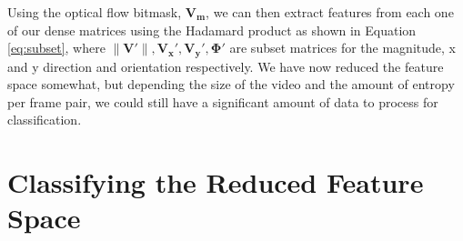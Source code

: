 Using the optical flow bitmask, $\mathbf{V_m}$, we can then extract features
from each one of our dense matrices using the Hadamard product as shown in
Equation \ref{eq:subset}, where $\|\mathbf{V\prime}\|, \mathbf{V_x\prime},\mathbf{V_y\prime},
\mathbf{\Phi\prime}$ are subset matrices for the magnitude, x and y direction
and orientation respectively. We have now reduced the feature space somewhat,
but depending the size of the video and the amount of entropy per frame pair,
we could still have a significant amount of data to process for classification.





\section{\label{section:classification}Classifying the Reduced Feature Space}
